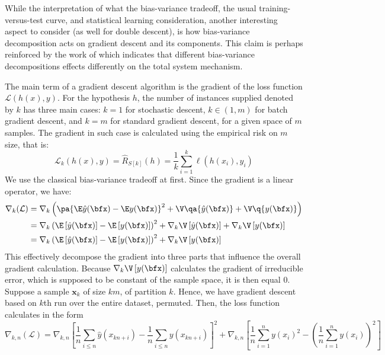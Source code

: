 While the interpretation of what the bias-variance tradeoff, the usual training-versus-test curve, and statistical learning consideration, another interesting aspect to consider (as well for double descent), is how bias-variance decomposition acts on gradient descent and its components. This claim is perhaps reinforced by the work of \cite{adlam2020understandingdoubledescentrequires} which indicates that different bias-variance decompositions effects differently on the total system mechanism. 

The main term of a gradient descent algorithm is the gradient of the loss function $\mathcal{L}(h(x),y)$. For the hypothesis $h$, the number of instances supplied denoted by $k$ has three main cases: $k=1$ for stochastic descent, $k\in (1,m)$ for batch gradient descent, and $k=m$ for standard gradient descent, for a given space of $m$ samples. The gradient in such case is calculated using the empirical risk on $m$ size, that is: 
\begin{equation}
    \mathcal{L}_{k}(h(x),y) = \hat{R}_{S[k]}(h) = \frac{1}{k} \sum^{k}_{i=1} \ell(h(x_{i}),y_{i})
\end{equation}
We use the classical bias-variance tradeoff at first. Since the gradient is a linear operator, we have: 
\begin{equation}
    \begin{split}
        \nabla_{k}(\mathcal{L}) &= \nabla_{k}\left(\pa{\E\hat{y}(\bfx) - \E y(\bfx)}^2 + \V\qa{\hat{y}(\bfx)} + \V\q{y(\bfx)}\right)\\
        & = \nabla_{k}\left( \E\left[\hat{y}(\bfx)\right] - \E\left[y(\bfx)\right] \right)^2 + \nabla_{k}\V\left[\hat{y}(\bfx)\right] + \nabla_{k}\V\left[y(\bfx)\right] \\
        & = \nabla_{k}\left( \E\left[\hat{y}(\bfx)\right] - \E\left[y(\bfx)\right] \right)^2 + \nabla_{k}\V\left[y(\bfx)\right]
    \end{split}
\end{equation}
This effectively decompose the gradient into three parts that influence the overall gradient calculation. Because $\nabla_{k}\V\left[y(\bfx)\right]$ calculates the gradient of irreducible error, which is supposed to be constant of the sample space, it is then equal $0$. Suppose a sample $\mathbf{x}_{k}$ of size $km$, of partition $k$. Hence, we have gradient descent based on $k$th run over the entire dataset, permuted. Then, the loss function calculates in the form 
\begin{equation}
  \nabla_{k,n}(\mathcal{L}) = \nabla_{k,n}\left[ \frac{1}{n}\sum_{i\leq n} \hat{y}(x_{kn+i})  - \frac{1}{n}\sum_{i\leq n} y(x_{kn+i}) \right]^{2} + \nabla_{k,n} \left[ \frac{1}{n}\sum_{i=1}^n y(x_i)^2 - \left( \frac{1}{n}\sum_{i=1}^n y(x_i) \right)^2 \right]
\end{equation}
